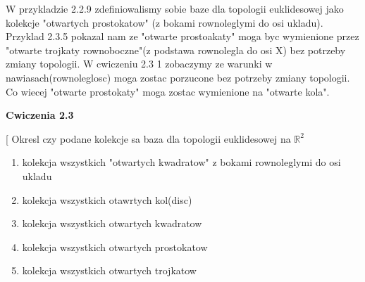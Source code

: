 \documentclass{article}
\makeatletter
\def\myitem{%
   \@ifnextchar[ \@myitem{\@noitemargtrue\@myitem[\@itemlabel]}}
\def\@myitem[#1]{\item[#1]\mbox{}\\}
\makeatother
\begin{document}
\vspace{1cm}

W przykladzie 2.2.9 zdefiniowalismy sobie baze dla topologii euklidesowej jako kolekcje "otwartych prostokatow" (z bokami rownoleglymi do osi ukladu). Przyklad 2.3.5 pokazal nam ze "otwarte prostoakaty" moga byc wymienione przez "otwarte trojkaty rownoboczne"(z podstawa rownolegla do osi X) bez potrzeby zmiany topologii. W cwiczeniu 2.3 1 zobaczymy ze warunki w nawiasach(rownoleglosc) moga zostac porzucone bez potrzeby zmiany topologii. Co wiecej "otwarte prostokaty" moga zostac wymienione na "otwarte kola".

\textbf{Cwiczenia 2.3}

\hrulefill

\begin{enumerate}[align=left] %
        \renewcommand{\labelenumi}{\textbf{Cwiczenie 2.3.\arabic{enumi}}}
        \myitem Okresl czy podane kolekcje sa baza dla topologii euklidesowej na $\mathbb{R}^{2}$
        
        \begin{enumerate}
            \item kolekcja wszystkich "otwartych kwadratow" z bokami rownoleglymi do osi ukladu
            \item kolekcja wszystkich otawrtych kol(disc)
            \item kolekcja wszystkich otwartych kwadratow
            \item kolekcja wszystkich otwartych prostokatow
            \item kolekcja wszystkich otwartych trojkatow
          
        \end{enumerate}


\end{enumerate}
\end{document}
